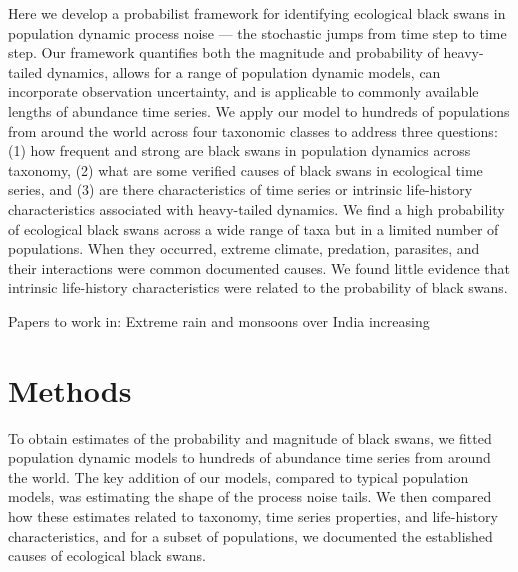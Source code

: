 Here we develop a probabilist framework for identifying ecological black swans
in population dynamic process noise --- the stochastic jumps from time step to
time step. Our framework quantifies both the magnitude and probability of
heavy-tailed dynamics, allows for a range of population dynamic models, can
incorporate observation uncertainty, and is applicable to commonly available
lengths of abundance time series. We apply our model to hundreds of populations
from around the world across four taxonomic classes to address three questions:
(1) how frequent and strong are black swans in population dynamics across
taxonomy, (2) what are some verified causes of black swans in ecological time
series, and (3) are there characteristics of time series or intrinsic
life-history characteristics associated with heavy-tailed dynamics. We find
a high probability of ecological black swans across a wide range of taxa but in
a limited number of populations. When they occurred, extreme climate,
predation, parasites, and their interactions were common documented causes. We
found little evidence that intrinsic life-history characteristics were related
to the probability of black swans.

Papers to work in: \citep{inchausti2002, halley2002, inchausti2001}
\citep{jentsch2007} \citep{ward2007} \citep{garcia-carreras2011}
\citep{sornette2009} \citep{nunez2012} \citep{thompson2013}
\citep{beaugrand2012} \citep{pine-iii2009} \citep{doak2008} Extreme rain and
monsoons over India increasing \citep{goswami2006} \citep{smale2013}
\citep{easterling2000} \citep{scheffer2003} \citep{katz2005} \citep{taleb2007}
\citep{vasseur2014} \citep{vert-pre2013} \citep{lindenmayer2010}
\citep{valpine2002} \citep{gregory2010} \citet{garcia-carreras2011}
\citeauthor{brook2006} \citetext{\citeyear{brook2006};
  \citealp{herrandoprez2014}} \citep{sibly2005, ziebarth2010}

\section{Methods}

To obtain estimates of the probability and magnitude of black swans, we fitted
population dynamic models to hundreds of abundance time series from around the
world. The key addition of our models, compared to typical population models,
was estimating the shape of the process noise tails. We then compared how these
estimates related to taxonomy, time series properties, and life-history
characteristics, and for a subset of populations, we documented the established
causes of ecological black swans.

